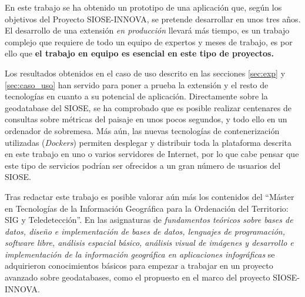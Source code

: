 En este trabajo se ha obtenido un prototipo de una aplicación que, según los objetivos del Proyecto SIOSE-INNOVA, se pretende desarrollar en unos tres años. El desarrollo de una extensión \textit{en producción} llevará más tiempo, es un trabajo complejo que requiere de todo un equipo de expertos y meses de trabajo, es por ello que \textbf{el trabajo en equipo es esencial en este tipo de proyectos.}

Los resultados obtenidos en el caso de uso descrito en las secciones \ref{sec:exp} y \ref{sec:caso_uso} han servido para poner a prueba la extensión y el resto de tecnologías en cuanto a su potencial de aplicación. Directamente sobre la geodatabase del SIOSE, se ha comprobado que es posible realizar centenares de consultas sobre métricas del paisaje en unos pocos segundos, y todo ello en un ordenador de sobremesa. Más aún, las nuevas tecnologías de contenerización utilizadas (\textit{Dockers}) permiten desplegar y distribuir toda la plataforma descrita en este trabajo en uno o varios servidores de Internet, por lo que cabe pensar que este tipo de servicios podrían ser ofrecidos a un gran número de usuarios del SIOSE.

Tras redactar este trabajo es posible valorar aún más los contenidos del ``Máster en Tecnologías de la Información Geográfica para la Ordenación del Territorio: SIG y Teledetección''. En las asignaturas de \textit{fundamentos teóricos sobre bases de datos, diseño e implementación de bases de datos, lenguajes de programación, software libre, análisis espacial básico, análisis visual de imágenes y desarrollo e implementación de la información geográfica en aplicaciones infográficas} se adquirieron conocimientos básicos para empezar a trabajar en un proyecto avanzado sobre geodatabases, como el propuesto en el marco del proyecto SIOSE-INNOVA.
